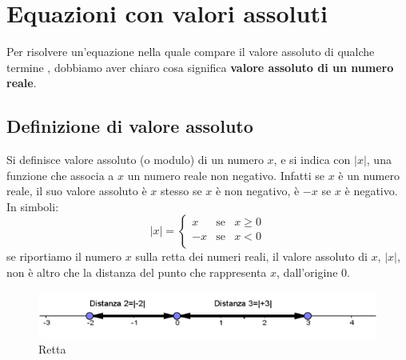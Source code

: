 \section{Equazioni con valori assoluti}
\label{sec:irvalass_valass}

Per risolvere un'equazione nella quale compare il valore assoluto di qualche 
termine , dobbiamo aver chiaro cosa significa \textbf{valore assoluto di un 
numero reale}.

\subsection{Definizione di valore assoluto}

Si definisce valore assoluto (o modulo) di un numero $x$, e si indica con 
$|x|$, 
una funzione che associa a $x$ un numero reale non negativo. Infatti se $x$ è 
un 
numero reale, il suo valore assoluto è $x$ stesso se $x$ è non negativo, è $-x$ 
se $x$ è negativo.\\
In simboli:
$$|x|=\left\lbrace 
\begin{array}{lcl}
x & \text{se} & x\geq 0 \\
-x & \text{se} & x< 0 \\
\end{array}
\right. 
$$
se riportiamo il numero $x$ sulla retta dei numeri reali, il valore assoluto di 
$x$, $|x|$, non è altro che la distanza del punto che rappresenta $x$, 
dall'origine 0.

\begin{figure}[h]
\begin{center}
\begin{inaccessibleblock}[TODO]
\includegraphics[width=0.8\linewidth]{img/imm1} %
\end{inaccessibleblock}
\caption{Retta}
\label{fig:abs_imm1}
\end{center}
\end{figure}

